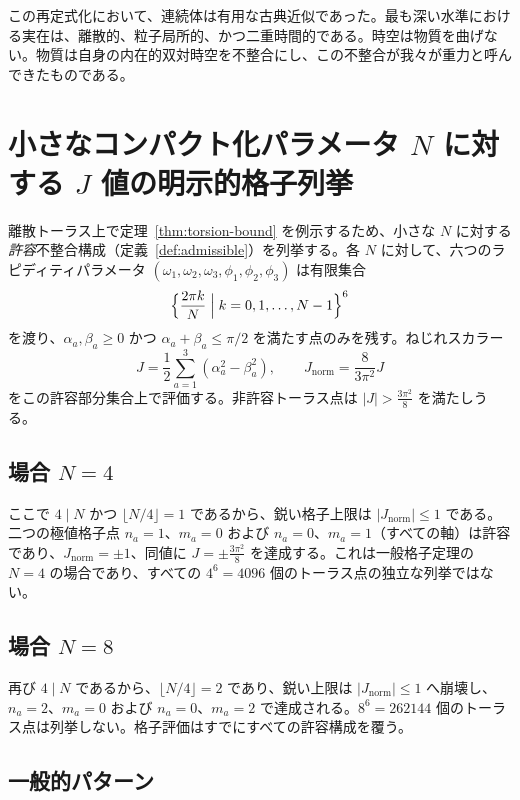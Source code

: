 \documentclass[a4paper]{article}
\theoremstyle{definition}
\theoremstyle{remark}
\newcommand{\Jnorm}{J_{\mathrm{norm}}}
\newcommand{\Jbound}{\frac{3\pi^2}{8}}
\begin{document}
この再定式化において、連続体は有用な古典近似であった。最も深い水準における実在は、離散的、粒子局所的、かつ二重時間的である。時空は物質を曲げない。物質は自身の内在的双対時空を不整合にし、この不整合が我々が重力と呼んできたものである。

\appendix

\section{小さなコンパクト化パラメータ \texorpdfstring{\( N \)}{N} に対する \texorpdfstring{\( J \)}{J} 値の明示的格子列挙}

離散トーラス上で定理~\ref{thm:torsion-bound} を例示するため、小さな \( N \) に対する\emph{許容}不整合構成（定義~\ref{def:admissible}）を列挙する。各 \( N \) に対して、六つのラピディティパラメータ \( (\omega_1,\omega_2,\omega_3,\phi_1,\phi_2,\phi_3) \) は有限集合
\[
\Bigl\{ \frac{2\pi k}{N} \Bigm| k = 0,1,\dots,N-1 \Bigr\}^6
\]
を渡り、\(\alpha_a,\beta_a \geq 0\) かつ \(\alpha_a + \beta_a \leq \pi/2\) を満たす点のみを残す。ねじれスカラー
\[
J = \frac12 \sum_{a=1}^3 (\alpha_a^2 - \beta_a^2), \qquad
\Jnorm = \frac{8}{3\pi^2} J
\]
をこの許容部分集合上で評価する。非許容トーラス点は \(|J| > \Jbound\) を満たしうる。

\subsection{場合 \texorpdfstring{$N = 4$}{N = 4}}

ここで \(4\mid N\) かつ \(\lfloor N/4\rfloor=1\) であるから、鋭い格子上限は \(|\Jnorm|\le 1\) である。二つの極値格子点 \(n_a=1\)、\(m_a=0\) および \(n_a=0\)、\(m_a=1\)（すべての軸）は許容であり、\(\Jnorm=\pm 1\)、同値に \(J=\pm\Jbound\) を達成する。これは一般格子定理の \(N=4\) の場合であり、すべての \(4^6=4096\) 個のトーラス点の独立な列挙ではない。

\subsection{場合 \texorpdfstring{$N = 8$}{N = 8}}

再び \(4\mid N\) であるから、\(\lfloor N/4\rfloor=2\) であり、鋭い上限は \(|\Jnorm|\le 1\) へ崩壊し、\(n_a=2\)、\(m_a=0\) および \(n_a=0\)、\(m_a=2\) で達成される。\(8^6=262144\) 個のトーラス点は列挙しない。格子評価はすでにすべての許容構成を覆う。

\subsection{一般的パターン}
\end{document}
